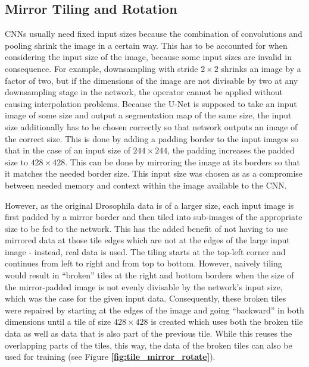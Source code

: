 		\subsection{Mirror Tiling and Rotation}
\label{subsec:mirror_tiling}
CNNs usually need fixed input sizes because the combination of convolutions and pooling shrink the image in a certain way. This has to be accounted for when considering the input size of the image, because some input sizes are invalid in consequence. For example, downsampling with stride $2 \times 2$ shrinks an image by a factor of two, but if the dimensions of the image are not divisable by two at any downsampling stage in the network, the operator cannot be applied without causing interpolation problems. Because the U-Net is supposed to take an input image of some size and output a segmentation map of the same size, the input size additionally has to be chosen correctly so that network outputs an image of the correct size. This is done by adding a padding border to the input images so that in the case of an input size of $244 \times 244$, the padding increases the padded size to $428 \times 428$. This can be done by mirroring the image at its borders so that it matches the needed border size. This input size was chosen as as a compromise between needed memory and context within the image available to the CNN.

However, as the original Drosophila data is of a larger size, each input image is first padded by a mirror border and then tiled into sub-images of the appropriate size to be fed to the network. This has the added benefit of not having to use mirrored data at those tile edges which are not at the edges of the large input image - instead, real data is used. The tiling starts at the top-left corner and continues from left to right and from top to bottom. However, naively tiling would result in ``broken'' tiles at the right and bottom borders when the size of the mirror-padded  image is not evenly divisable by the network's input size, which was the case for the given input data. Consequently, these broken tiles were repaired by starting at the edges of the image and going ``backward'' in both dimensions until a tile of size $428 \times 428$ is created which uses both the broken tile data as well as data that is also part of the previous tile. While this reuses the overlapping parts of the tiles, this way, the data of the broken tiles can also be used for training (see Figure \textbf{\ref{fig:tile_mirror_rotate}}).\\

